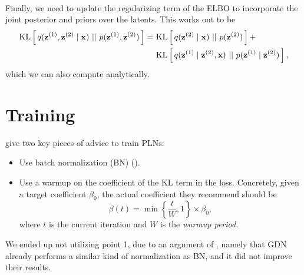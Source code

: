 \paragraph{}
Finally, we need to update the regularizing term of the ELBO to incorporate the
joint posterior and priors over the latents. This works out to be
\begin{align*}
  \mathrm{KL}\left[\,q(\mathbf{z}^{(1)}, \mathbf{z}^{(2)} \mid \mathbf{x})\,\,||\,\,p(\mathbf{z}^{(1)}, \mathbf{z}^{(2)})\,\right] =\,\,& 
  \mathrm{KL}\left[\,q(\mathbf{z}^{(2)} \mid \mathbf{x})\,\,||\,\,p(\mathbf{z}^{(2)})\,\right] + \\
  &\mathrm{KL}\left[\,q(\mathbf{z}^{(1)} \mid \mathbf{z}^{(2)} , \mathbf{x})\,\,||\,\,p(\mathbf{z}^{(1)} \mid \mathbf{z}^{(2)})\,\right],
\end{align*}
which we can also compute analytically.

\section{Training}
\par \cite{sonderby2016train} give two key pieces of advice to train PLNs:
\begin{itemize}
\item Use batch normalization (BN) (\cite{ioffe2015batch}).
\item Use a warmup on the coefficient of the KL term in the loss.
  Concretely, given a target coefficient $\beta_0$, the actual coefficient they
  recommend should be
  \[
    \beta(t) = \min\left\{ \frac{t}{W}, 1 \right\} \times \beta_0,
  \]
  where $t$ is the current iteration and $W$ is the \textit{warmup period}.
\end{itemize} 
We ended up not utilizing point 1, due to an argument of
\cite{balle2018variational}, namely that GDN already performs a similar kind of
normalization as BN, and it did not improve their results. 


